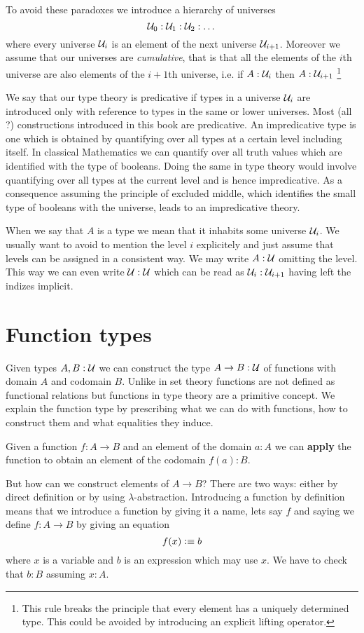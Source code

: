 To avoid these paradoxes we introduce a hierarchy of universes
\[ \mathcal{U}_0 : \mathcal{U}_1 : \mathcal{U}_2 : \dots \]
where every universe $\mathcal{U}_i$ is an element of the next universe
$\mathcal{U}_{i+1}$. Moreover we assume that our universes are
\emph{cumulative}, that is that all the elements of the $i$th
universe are also elements of the $i+1$th universe, i.e. if
$A:\mathcal{U}_i$ then $A:\mathcal{U}_{i+1}$
\footnote{This rule breaks the principle that every element
  has a uniquely determined type. This could be avoided by introducing
  an explicit lifting operator.}

We say that our type theory is predicative if types in a universe $\mathcal{U}_i$ are introduced only with reference to types in the same or lower universes. Most (all ?) constructions introduced in this book are predicative. An impredicative type is one which is obtained by quantifying over all types at a certain level including itself. In classical Mathematics we can quantify over all truth values which are identified with the type of booleans. Doing the same in type theory would involve quantifying over all types at the current level and is hence impredicative. As a consequence assuming the principle of excluded middle, which identifies the small type of booleans with the universe, leads to an impredicative theory.

When we say that $A$ is a type we mean that it inhabits some universe
$\mathcal{U}_i$. We usually want to avoid to mention the level $i$ explicitely
and just assume that levels can be assigned in a consistent way. We
may write $A:\mathcal{U}$ omitting the level. This way we can even write
$\mathcal{U}:\mathcal{U}$ which can be read as $\mathcal{U}_i:\mathcal{U}_{i+1}$ having left the
indizes implicit. 

\section{Function types}
\label{sec:function-types}

Given types $A,B :\mathcal{U}$ we can construct the type $A \to B:\mathcal{U}$ of functions with domain $A$
and codomain $B$. Unlike in set theory functions are not defined as
functional relations but functions in type theory are a primitive
concept. We explain the function type by prescribing what we can do with functions, 
how to construct them and what equalities they induce.

Given a function $f : A \to B$ and an element of the domain $a : A$ we
can \textbf{apply} the function to obtain an element of the codomain
$f(a) : B$. 

But how can we construct elements of $A \to B$? There are two ways:
either by direct definition or by using
$\lambda$-abstraction. Introducing a function by definition means that
we introduce a function by giving it a name, lets say $f$ and saying
we define $f : A \to B$ by giving an equation
\[ f(x) \vcentcolon\equiv b \]
where $x$ is a variable and $b$ is an expression which may use $x$.
We have to check that $b : B$ assuming $x:A$.


